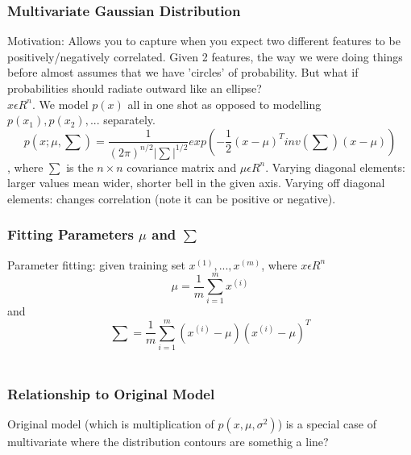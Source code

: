 \documentclass[11pt,letterpaper]{article}
\begin{document}
\subsubsection{Multivariate Gaussian Distribution}
Motivation: Allows you to capture when you expect two different features to be positively/negatively correlated. Given 2 features, the way we were doing things before almost assumes that we have 'circles' of probability. But what if probabilities should radiate outward like an ellipse? \\
$x \epsilon R^n$. We model $p(x)$ all in one shot as opposed to modelling $p(x_1), p(x_2),...$ separately.
$$p(x;\mu, \sum) = \frac{1}{(2\pi)^{n/2}|\sum|^{1/2}} exp(-\frac{1}{2}(x-\mu)^Tinv(\sum)(x-\mu)) $$, where $\sum$ is the $n \times n$ covariance matrix and $\mu \epsilon R^n $. Varying diagonal elements: larger values mean wider, shorter bell in the given axis. Varying off diagonal elements: changes correlation (note it can be positive or negative).
 \subsubsection{Fitting Parameters $\mu$ and $\sum$}
 Parameter fitting: given training set $x^{(1)},...,x^{(m)}$, where $x \epsilon R^n$ $$\mu = \frac{1}{m	}\sum_{i=1}^{m}x^{(i)}$$ and $$\sum = \frac{1}{m}\sum_{i=1}^{m}(x^{(i)} - \mu)(x^{(i)} - \mu)^T $$\\
\subsubsection{Relationship to Original Model}
Original model (which is multiplication of $p(x, \mu, \sigma^2)$) is a special case of multivariate where the distribution contours are somethig a line?
\end{document}
